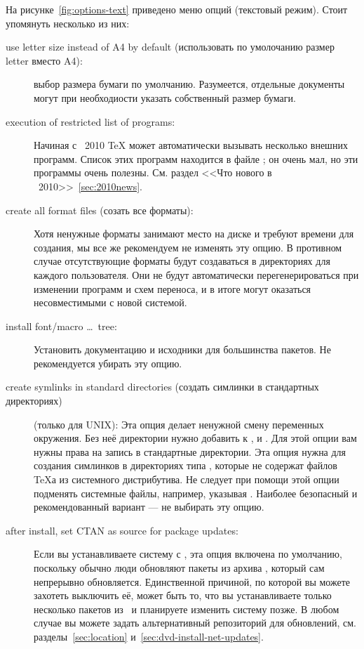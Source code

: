 \documentclass{article}
\begin{document}
На рисунке~\ref{fig:options-text} приведено меню опций (текстовый
режим).  Стоит упомянуть несколько из них:
\begin{description}
\item[use letter size instead of A4 by default (использовать по
  умолочанию размер letter вместо A4):] выбор размера бумаги
  по умолчанию.  Разумеется, отдельные документы могут при
  необходиости указать собственный размер бумаги. 

\item[execution of restricted list of programs:] Начиная с \TL\ 2010
  \TeX{} может автоматически вызывать несколько внешних программ.
  Список этих программ находится в файле ; он
  очень мал, но эти программы очень полезны.  См. раздел <<Что нового
  в \TL\ 2010>>~\ref{sec:2010news}.

\item[create all format files (созать все форматы):] Хотя ненужные
  форматы занимают место на диске и требуют времени для создания, мы
  все же рекомендуем не изменять эту опцию.  В противном случае
  отсутствующие форматы будут создаваться в директориях
   для каждого пользователя.  Они не будут
  автоматически перегенерироваться при изменении программ и схем
  переноса, и в итоге могут оказаться несовместимыми с новой системой.


\item[install font/macro \ldots\ tree:] Установить документацию и
  исходники для большинства пакетов.  Не рекомендуется убирать эту
  опцию. 


\item[create symlinks in standard directories (создать симлинки в
  стандартных директориях)] (только для UNIX): Эта опция делает
  ненужной смену переменных окружения.  Без неё директории \TL{} нужно
  добавить к ,  и .
  Для этой опции вам нужны права на запись в стандартные директории.
  Эта опция нужна для создания симлинков в директориях типа
  , которые не содержат файлов \TeX а из
  системного дистрибутива.  Не следует при помощи этой опции подменять
  системные файлы, например, указывая .  Наиболее
  безопасный и рекомендованный вариант --- не выбирать эту опцию.  

\item[after install, set CTAN as source for package updates:] Если вы устанавливаете
  систему с \DVD, эта опция включена по умолчанию, поскольку обычно
  люди обновляют пакеты из архива \CTAN, который сам непрерывно
  обновляется.  Единственной причиной, по которой вы можете захотеть
  выключить её, может быть то, что вы устанавливаете только несколько
  пакетов из \DVD\ и планируете изменить систему позже.  В любом
  случае вы можете задать альтернативный репозиторий для обновлений,
  см. разделы~\ref{sec:location} и~\ref{sec:dvd-install-net-updates}. 
\end{description}
\end{document}
